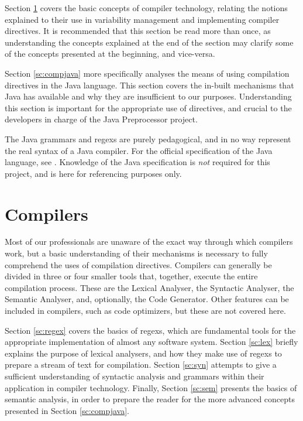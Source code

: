 Section \ref{sc:comp} covers the basic concepts of compiler technology, relating the notions explained to their use in variability management and implementing compiler directives. It is recommended that this section be read more than once, as understanding the concepts explained at the end of the section may clarify some of the concepts presented at the beginning, and vice-versa.

Section \ref{sc:compjava} more specifically analyses the means of using compilation directives in the Java language. This section covers the in-built mechanisms that Java has available and why they are insufficient to our purposes. Understanding this section is important for the appropriate use of directives, and crucial to the developers in charge of the Java Preprocessor project.

The Java \gls{grammar}s and \gls{regex}s are purely pedagogical, and in no way represent the real syntax of a Java compiler. For the official specification of the Java language, see \cite{GOSLING:2014}. Knowledge of the Java specification is \emph{not} required for this project, and is here for referencing purposes only.


\section{Compilers}
\label{sc:comp}

Most of our professionals are unaware of the exact way through which compilers work, but a basic understanding of their mechanisms is necessary to fully comprehend the uses of compilation directives. Compilers can generally be divided in three or four smaller tools that, together, execute the entire compilation process. These are the Lexical Analyser, the Syntactic Analyser, the Semantic Analyser, and, optionally, the Code Generator. Other features can be included in compilers, such as code optimizers, but these are not covered here.

Section \ref{sc:regex} covers the basics of \gls{regex}s, which are fundamental tools for the appropriate implementation of almost any software system. Section \ref{sc:lex} briefly explains the purpose of lexical analysers, and how they make use of \gls{regex}s to prepare a stream of text for compilation. Section \ref{sc:syn} attempts to give a sufficient understanding of syntactic analysis and \gls{grammar}s within their application in compiler technology. Finally, Section \ref{sc:sem} presents the basics of semantic analysis, in order to prepare the reader for the more advanced concepts presented in Section \ref{sc:compjava}.

